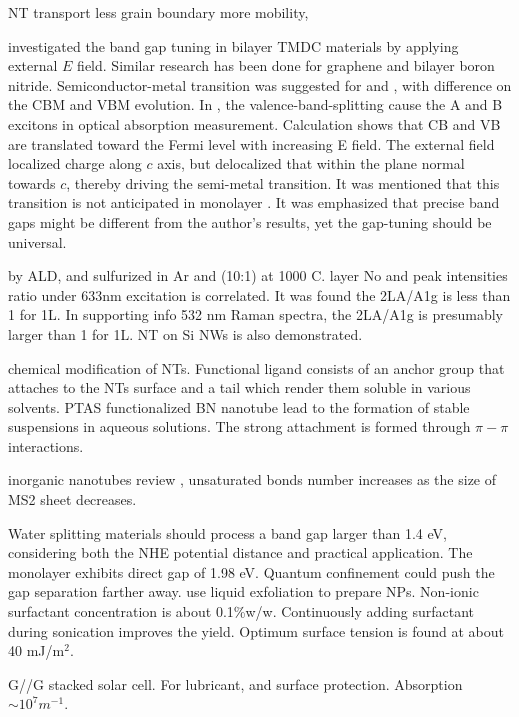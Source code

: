  NT transport \cite{Zhang2012c}
less grain boundary more mobility, 

\citeauthor{Ramasubramaniam2011} investigated the band gap tuning in bilayer TMDC materials by applying external $E$ field. Similar research has been done for graphene and bilayer boron nitride. Semiconductor-metal transition was suggested for  and , with difference on the CBM and VBM evolution. In , the valence-band-splitting cause the A and B excitons in optical absorption measurement. Calculation shows that CB and VB are translated toward the Fermi level with increasing E field.  The external field localized charge along $c$ axis, but delocalized that within the plane normal towards $c$, thereby driving the semi-metal transition. It was mentioned that this transition is not anticipated in monolayer . It was emphasized that precise band gaps might be different from the author’s results, yet the gap-tuning should be universal.\cite{Ramasubramaniam2011}

\cite{Song2013}  by ALD, and sulfurized in Ar and  (10:1) at 1000 C.  layer No and peak intensities ratio under 633nm excitation is correlated. It was found the 2LA/A1g is less than 1 for 1L. In supporting info 532 nm Raman spectra, the 2LA/A1g is presumably larger than 1 for 1L.  NT on Si NWs is also demonstrated.

\cite{Tenne2010} chemical modification of NTs. Functional ligand consists of an anchor group that attaches to the NTs surface and a tail which render them soluble in various solvents. PTAS functionalized BN nanotube lead to the formation of stable suspensions in aqueous solutions. The strong attachment is formed through $\pi-\pi$ interactions.

inorganic nanotubes review \cite{Tenne2004} , unsaturated bonds number increases as the size of MS2 sheet decreases.

Water splitting materials should process a band gap larger than 1.4 eV, considering both the NHE potential distance and practical application. The monolayer  exhibits direct gap of 1.98 eV. Quantum confinement could push the gap separation farther away. \cite{wilcoxon1997} \citeauthor{Notley2013} use liquid exfoliation to prepare  NPs.\cite{Notley2013} Non-ionic surfactant concentration is about 0.1\%w/w. Continuously adding surfactant during sonication improves the yield. Optimum surface tension is found at about 40 mJ/m$^2$.

G//G stacked solar cell. For lubricant, and surface protection. Absorption $\sim 10^7 m^{-1}$. \cite{Britnell2013}

